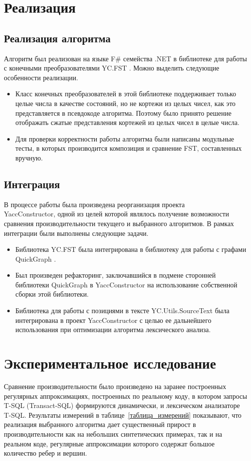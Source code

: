 \documentclass[14pt]{matmex-diploma}
\begin{document}
\section{Реализация}
\subsection{Реализация алгоритма}
Алгоритм был реализован на языке F\# семейства .NET в библиотеке для работы с конечными преобразователями YC.FST \cite{polubelova}. Можно выделить следующие особенности реализации.
\begin{itemize}
\item Класс конечных преобразователей в этой библиотеке поддерживает только целые числа в качестве состояний, но не кортежи из целых чисел, как это представляется в псевдокоде алгоритма. Поэтому было принято решение отображать сжатые представления кортежей из целых чисел в целые числа.
\item Для проверки корректности работы алгоритма были написаны модульные тесты, в которых производится композиция и сравнение FST, составленных вручную.
\end{itemize} 


\subsection{Интеграция}
В процессе работы была произведена реорганизация проекта\\ YaccConstructor, одной из целей которой являлось получение возможности сравнения производительности текущего и выбранного алгоритмов. В рамках интеграции были выполнены следующие задачи.

\begin{itemize}
\item Библиотека YC.FST была интегрирована в библиотеку для работы с графами QuickGraph \cite{quick_graph}.
\item Был произведен рефакторинг, заключавшийся в подмене сторонней библиотеки QuickGraph в YaccConstructor на использование собственной сборки этой библиотеки.
\item Библиотека для работы с позициями в тексте YC.Utils.SourceText \cite{source_text} была интегрирована в проект YaccConstructor с целью ее дальнейшего использования при оптимизации алгоритма лексического анализа.
\end{itemize} 

\section{Экспериментальное исследование}
Сравнение производительности было произведено на заранее построенных регулярных аппроксимациях, построенных по реальному коду, в котором запросы T-SQL (Transact-SQL) формируются динамически, и лексическом анализаторе T-SQL. Результаты измерений в таблице~\ref{таблица_измерений} показывают, что реализация выбранного алгоритма дает существенный прирост в производительности как на небольших синтетических примерах, так и на реальном коде, регулярные аппроксимации которого содержат большое количество ребер и вершин.
\end{document}
